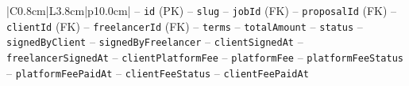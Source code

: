 \begin{center}
\begin{longtable}{|C{0.8cm}|L{3.8cm}|p{10.0cm}|}
\hspace*{1em}-- \texttt{id} (PK) \newline
\hspace*{1em}-- \texttt{slug} \newline
\hspace*{1em}-- \texttt{job\allowbreak Id} (FK) \newline
\hspace*{1em}-- \texttt{proposal\allowbreak Id} (FK) \newline
\hspace*{1em}-- \texttt{client\allowbreak Id} (FK) \newline
\hspace*{1em}-- \texttt{freelancer\allowbreak Id} (FK) \newline
\hspace*{1em}-- \texttt{terms} \newline
\hspace*{1em}-- \texttt{total\allowbreak Amount} \newline
\hspace*{1em}-- \texttt{status} \newline
\hspace*{1em}-- \texttt{signed\allowbreak By\allowbreak Client} \newline
\hspace*{1em}-- \texttt{signed\allowbreak By\allowbreak Freelancer} \newline
\hspace*{1em}-- \texttt{client\allowbreak Signed\allowbreak At} \newline
\hspace*{1em}-- \texttt{freelancer\allowbreak Signed\allowbreak At} \newline
\hspace*{1em}-- \texttt{client\allowbreak Platform\allowbreak Fee} \newline
\hspace*{1em}-- \texttt{platform\allowbreak Fee} \newline
\hspace*{1em}-- \texttt{platform\allowbreak Fee\allowbreak Status} \newline
\hspace*{1em}-- \texttt{platform\allowbreak Fee\allowbreak Paid\allowbreak At} \newline
\hspace*{1em}-- \texttt{client\allowbreak Fee\allowbreak Status} \newline
\hspace*{1em}-- \texttt{client\allowbreak Fee\allowbreak Paid\allowbreak At} \newline

\end{longtable}
\end{center}
